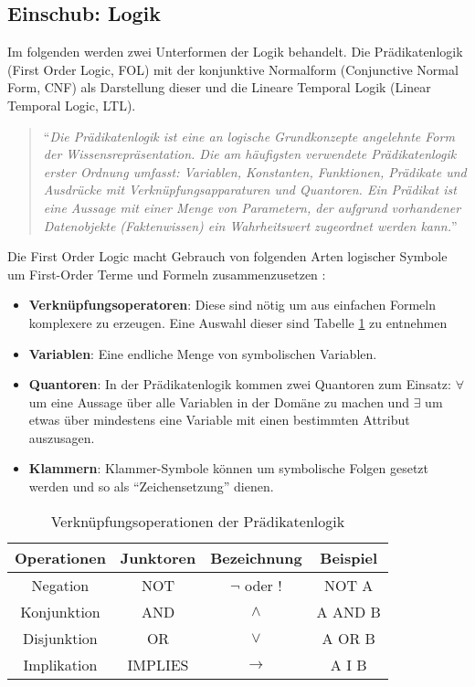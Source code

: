 \subsection{Einschub: Logik}
\label{subsec:Logic}
Im folgenden werden zwei Unterformen der Logik behandelt. Die Prädikatenlogik (First Order Logic, FOL) mit der konjunktive Normalform (Conjunctive Normal Form, CNF) als Darstellung dieser und die Lineare Temporal Logik (Linear Temporal Logic, LTL).
\begin{quote}
	"`\textit{Die Prädikatenlogik ist eine an logische Grundkonzepte angelehnte Form der Wissensrepräsentation. Die am häufigsten verwendete Prädikatenlogik erster Ordnung umfasst: Variablen, Konstanten, Funktionen, Prädikate und Ausdrücke mit Verknüpfungsapparaturen und Quantoren. Ein Prädikat ist eine Aussage mit einer Menge von Parametern, der aufgrund vorhandener Datenobjekte (Faktenwissen) ein Wahrheitswert zugeordnet werden kann.}"' \cite{LS17}
\end{quote}
Die First Order Logic macht Gebrauch von folgenden Arten logischer Symbole um First-Order Terme und Formeln zusammenzusetzen \cite{BM11}:
\begin{itemize}
	\item[] \textbf{Verknüpfungsoperatoren}: Diese sind nötig um aus einfachen Formeln komplexere zu erzeugen. Eine Auswahl dieser sind Tabelle \ref{tab:junctors} zu entnehmen
	\item[] \textbf{Variablen}: Eine endliche Menge von symbolischen Variablen.
	\item[] \textbf{Quantoren}: In der Prädikatenlogik kommen zwei Quantoren zum Einsatz: $\forall$ um eine Aussage über alle Variablen in der Domäne zu machen und $\exists$ um etwas über mindestens eine Variable mit einen bestimmten Attribut auszusagen.
	\item[] \textbf{Klammern}: Klammer-Symbole können um symbolische Folgen gesetzt werden und so als "`Zeichensetzung"' dienen.
\end{itemize}
\begin{table}[]
	\centering
	\begin{tabular}{|c|c|c|c|}
		\hline
	Operationen & Junktoren  & Bezeichnung & Beispiel \\ \hline
	Negation & NOT & $\lnot$ oder $!$ & NOT A \\ \hline
	Konjunktion	& AND & $\land$ & A AND B \\ \hline
	Disjunktion & OR  & $\lor$ & A OR B \\ \hline
	Implikation	& IMPLIES & $\rightarrow$ & A I B \\ \hline
	\end{tabular}
	\caption{Verknüpfungsoperationen der Prädikatenlogik}
	\label{tab:junctors}
	\end{table}
